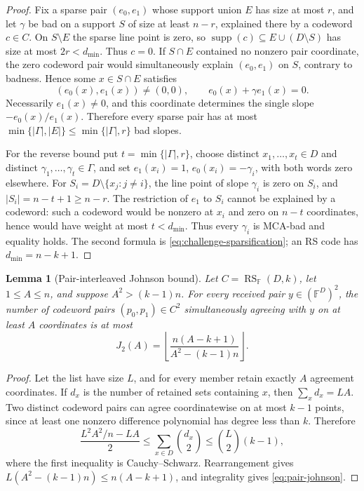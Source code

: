 \documentclass[11pt,a4paper]{amsart}
\numberwithin{equation}{section}
\newtheorem{lemma}[lemma]{Lemma}
\theoremstyle{remark}
\DeclareMathOperator{\RS}{RS}
\DeclareMathOperator{\supp}{supp}
\newcommand{\F}{\mathbb F}
\newcommand{\abs}[1]{\lvert #1\rvert}
\newcommand{\floor}[1]{\left\lfloor #1\right\rfloor}
\begin{document}
\begin{proof}
Fix a sparse pair \((e_0,e_1)\) whose support union \(E\) has size at
most \(r\), and let \(\gamma\) be bad on a support \(S\) of size at least
\(n-r\), explained there by a codeword \(c\in C\).  On \(S\setminus E\)
the sparse line point is zero, so
\(\supp(c)\subseteq E\cup(D\setminus S)\) has size at most \(2r<d_{\min}\).
Thus \(c=0\).  If \(S\cap E\) contained no nonzero pair coordinate, the
zero codeword pair would simultaneously explain \((e_0,e_1)\) on \(S\),
contrary to badness.  Hence some \(x\in S\cap E\) satisfies
\[
 (e_0(x),e_1(x))\ne(0,0),\qquad e_0(x)+\gamma e_1(x)=0.
\]
Necessarily \(e_1(x)\ne0\), and this coordinate determines the single
slope \(-e_0(x)/e_1(x)\).  Therefore every sparse pair has at most
\(\min\{\abs\Gamma,\abs E\}\le\min\{\abs\Gamma,r\}\) bad slopes.

For the reverse bound put \(t=\min\{\abs\Gamma,r\}\), choose distinct
\(x_1,\ldots,x_t\in D\) and distinct
\(\gamma_1,\ldots,\gamma_t\in\Gamma\), and set
\(e_1(x_i)=1\), \(e_0(x_i)=-\gamma_i\), with both words zero elsewhere.
For \(S_i=D\setminus\{x_j:j\ne i\}\), the line point of slope
\(\gamma_i\) is zero on \(S_i\), and
\(\abs{S_i}=n-t+1\ge n-r\).  The restriction of \(e_1\) to \(S_i\)
cannot be explained by a codeword: such a codeword would be nonzero at
\(x_i\) and zero on \(n-t\) coordinates, hence would have weight at most
\(t<d_{\min}\).  Thus every \(\gamma_i\) is MCA-bad and equality holds.
The second formula is \eqref{eq:challenge-sparsification}; an RS code has
\(d_{\min}=n-k+1\).
\end{proof}

\begin{lemma}[Pair-interleaved Johnson bound]
\label{lem:pair-interleaved-johnson}
Let \(C=\RS_\F(D,k)\), let \(1\le A\le n\), and suppose
\(A^2>(k-1)n\).  For every received pair \(y\in(\F^D)^2\), the number
of codeword pairs \((p_0,p_1)\in C^2\) simultaneously agreeing with
\(y\) on at least \(A\) coordinates is at most
\[
 J_2(A)=\floor{
   \frac{n(A-k+1)}{A^2-(k-1)n}}.                  \tag{HD2}
 \label{eq:pair-johnson}
\]
\end{lemma}

\begin{proof}
Let the list have size \(L\), and for every member retain exactly \(A\)
agreement coordinates.  If \(d_x\) is the number of retained sets
containing \(x\), then \(\sum_xd_x=LA\).  Two distinct codeword pairs
can agree coordinatewise on at most \(k-1\) points, since at least one
nonzero difference polynomial has degree less than \(k\).  Therefore
\[
 \frac{L^2A^2/n-LA}{2}
 \le\sum_{x\in D}\binom{d_x}{2}
 \le\binom L2(k-1),
\]
where the first inequality is Cauchy--Schwarz.  Rearrangement gives
\(L(A^2-(k-1)n)\le n(A-k+1)\), and integrality gives
\eqref{eq:pair-johnson}.
\end{proof}
\end{document}
